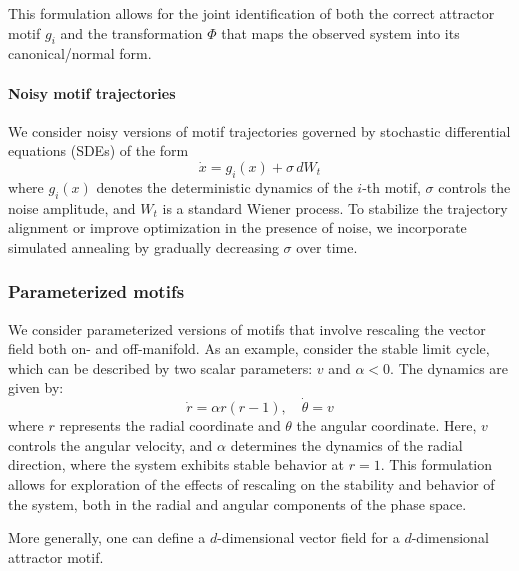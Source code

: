 \documentclass{article}
\theoremstyle{definition} \newtheorem{definition}{Definition}  \newtheorem{example}{Example}
\theoremstyle{remark} \newtheorem{remark}{Remark}
\newcounter{ct}
\begin{document}
This formulation allows for the joint identification of both the correct attractor motif \( g_i \) and the transformation \( \Phi \) that maps the observed system into its canonical/normal form.


\paragraph{Noisy motif trajectories}
We consider noisy versions of motif trajectories governed by stochastic differential equations (SDEs) of the form
\begin{equation}
\dot x = g_i(x) + \sigma \, dW_t
\end{equation}
where \( g_i(x) \) denotes the deterministic dynamics of the \( i \)-th motif, \( \sigma \) controls the noise amplitude, and \( W_t \) is a standard Wiener process.
To stabilize the trajectory alignment or improve optimization in the presence of noise, we incorporate simulated annealing by gradually decreasing \( \sigma \) over time.


\subsubsection{Parameterized motifs}
We consider parameterized versions of motifs that involve rescaling the vector field both on- and off-manifold.
As an example, consider the stable limit cycle, which can be described by two scalar parameters: \( v \) and \( \alpha < 0 \). The dynamics are given by:
\begin{equation}
\dot{r} = \alpha r (r - 1),
\quad \dot{\theta} = v
\end{equation}
where \( r \) represents the radial coordinate and \( \theta \) the angular coordinate. Here, \( v \) controls the angular velocity, and \( \alpha \) determines the dynamics of the radial direction, where the system exhibits stable behavior at \( r = 1 \). This formulation allows for exploration of the effects of rescaling on the stability and behavior of the system, both in the radial and angular components of the phase space.

More generally, one can define a $d$-dimensional vector field for a $d$-dimensional attractor motif.
\end{document}
